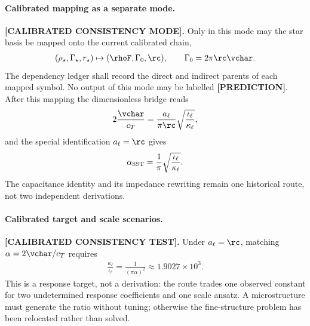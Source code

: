 \paragraph{Calibrated mapping as a separate mode.}
\textbf{[CALIBRATED CONSISTENCY MODE].}
Only in this mode may the star basis be mapped onto the current calibrated chain,
\begin{align}
    (\rho_\star,\Gamma_\star,r_\star)
    \mapsto
    (\rhoF,\Gamma_0,\rc),
    \qquad
    \Gamma_0=2\pi\rc\vchar.
    \label{eq:rt_link_calibrated_star_mapping}
\end{align}
The dependency ledger shall record the direct and indirect parents of each
mapped symbol.  No output of this mode may be labelled \textbf{[PREDICTION]}.
After this mapping the dimensionless bridge reads
\begin{align}
    2\frac{\vchar}{c_T}
    =
    \frac{a_\ell}{\pi\rc}
    \sqrt{\frac{\iota_\ell}{\kappa_\ell}},
    \label{eq:rt_link_alpha_route}
\end{align}
and the special identification \(a_\ell=\rc\) gives
\begin{align}
    \alpha_{\rm SST}
    =
    \frac{1}{\pi}
    \sqrt{\frac{\iota_\ell}{\kappa_\ell}}.
    \label{eq:rt_link_alpha_response_ratio}
\end{align}
The capacitance identity and its impedance rewriting remain one historical
route, not two independent derivations.

\paragraph{Calibrated target and scale scenarios.}
\textbf{[CALIBRATED CONSISTENCY TEST].}
Under \(a_\ell=\rc\), matching \(\alpha=2\vchar/c_T\) requires
\begin{align}
    \frac{\kappa_\ell}{\iota_\ell}
    =
    \frac{1}{(\pi\alpha)^2}
    \approx
    1.9027\times10^3.
    \label{eq:rt_link_alpha_ratio_target}
\end{align}
This is a response target, not a derivation: the route trades one observed
constant for two undetermined response coefficients and one scale ansatz.  A
microstructure must generate the ratio without tuning; otherwise the
fine-structure problem has been relocated rather than solved.

